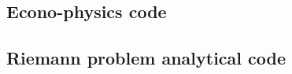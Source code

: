 \documentclass[twocolumn]{myarticle}
\begin{document}

\vspace{10pt}

\subsection{Econo-physics code}
\label{subsec:econo_physics_code}


\vspace{10pt}

\subsection{Riemann problem analytical code}
\label{subsec:riemann_problem_analytical_code}


\vspace{10pt}
\end{document}
